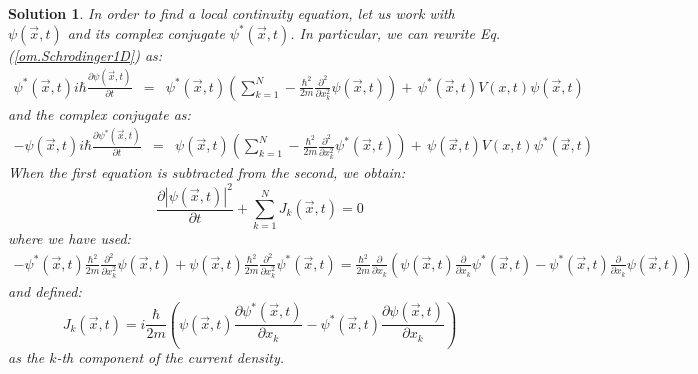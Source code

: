 \documentclass[onecolumn,nofootinbib, secnumarabic, amsmath, nobibnotes,11pt,aps,pra]{revtex4-1}
\newtheorem{solution}{Solution}
\newcommand{\eref}[1]{Eq. (\ref{#1})}
\begin{document}
\begin{solution}

In order to find a local continuity equation, let us work with $\psi(\vec{x},t)$ and its complex conjugate $\psi^*(\vec x,t)$. In particular, we can rewrite \eref{om.Schrodinger1D} as:
\begin{eqnarray}
\psi^*(\vec x,t) i \hbar \frac{\partial \psi(\vec x,t)} {\partial t}
&=& \psi^*(\vec x,t)\left( \sum_{k = 1}^N -\frac{\hbar^2}{2m}\frac
{\partial^2} {\partial x_k^2} \psi(\vec x,t)\right) +\, \psi^*(\vec x,t) V(x,t) \psi(\vec x,t)
\end{eqnarray}
and the complex conjugate as:
\begin{eqnarray}
-\psi(\vec x,t)i \hbar \frac{\partial \psi^*(\vec x,t)} {\partial t} &=& \psi(\vec x,t)\left( \sum_{k = 1}^N - \frac{\hbar^2}{2m}\frac {\partial^2} {\partial x_k^2} \psi^*(\vec x,t) \right)+\, \psi(\vec x,t)V(x,t) \psi^*(\vec x,t)
\end{eqnarray}
When the first equation is subtracted from the second, we obtain:
\begin{equation}
\frac{\partial |\psi(\vec{x},t)|^2} {\partial t} + \sum_{k = 1}^{N} J_k(\vec{x},t) = 0
\end{equation}
where we have used:
\begin{eqnarray}
- \psi^*(\vec x,t)\frac{\hbar^2}{2m}\frac {\partial^2} {\partial x_k^2} \psi(\vec x,t) + \psi(\vec x,t)\frac{\hbar^2}{2m}\frac {\partial^2} {\partial x_k^2} \psi^*(\vec x,t) = \frac{\hbar^2}{2m} \frac {\partial} {\partial x_k} \left( \psi(\vec x,t)\frac {\partial} {\partial x_k} \psi^*(\vec x,t)-\psi^*(\vec x,t)\frac {\partial} {\partial x_k} \psi(\vec x,t) \right)\qquad
\end{eqnarray}
and defined:
\begin{equation}
J_k(\vec{x},t) = i \frac {\hbar} {2 m} \left( \psi(\vec{x},t) \frac {\partial \psi^{*}(\vec{x},t)} {\partial x_k}- \psi^{*}(\vec{x},t) \frac {\partial \psi(\vec{x},t)} {\partial x_k} \right)
\end{equation}
as the $k$-th component of the current density.


\end{solution}


\makeatletter
\renewcommand\thesection{A.\arabic{section}}
\setcounter{section}{0}
\renewcommand\theequation{A.\@arabic\c@equation}
\setcounter{equation}{0}
\renewcommand\thetable{A.\@arabic\c@table}
\setcounter{table}{0}
\renewcommand\thefigure{A.\@arabic\c@figure}
\setcounter{figure}{0}
\makeatother
\end{document}
